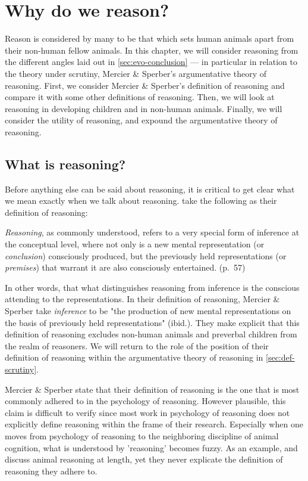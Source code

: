 \chapter{Why do we reason?}
\label{ch:reasoning}

Reason is considered by many to be that which sets human animals apart from their non-human fellow animals. In this chapter, we will consider reasoning from the different angles laid out in \cref{sec:evo-conclusion} --- in particular in relation to the theory under scrutiny, Mercier \& Sperber's argumentative theory of reasoning. First, we consider Mercier \& Sperber's definition of reasoning and compare it with some other definitions of reasoning. Then, we will look at reasoning in developing children and in non-human animals. Finally, we will consider the utility of reasoning, and expound the argumentative theory of reasoning.

\section{What is reasoning?}
\label{sec:reasoning-def}

Before anything else can be said about reasoning, it is critical to get clear what we mean exactly when we talk about reasoning. \citet{MS11} take the following as their definition of reasoning:

\begin{quoting}
    \emph{Reasoning}, as commonly understood, refers to a very special form of inference at the conceptual level, where not only is a new mental representation (or \emph{conclusion}) consciously produced, but the previously held representations (or \emph{premises}) that warrant it are also consciously entertained.
    \hfill (p.~57)
\end{quoting}
In other words, that what distinguishes reasoning from inference is the conscious attending to the representations.
In their definition of reasoning, Mercier \& Sperber take \emph{inference} to be "the production of new mental representations on the basis of previously held representations" (ibid.). They make explicit that this definition of reasoning excludes non-human animals and preverbal children from the realm of reasoners.
We will return to the role of the position of their definition of reasoning within the argumentative theory of reasoning in \cref{sec:def-scrutiny}.

Mercier \& Sperber state that their definition of reasoning is the one that is most commonly adhered to in the psychology of reasoning. However plausible, this claim is difficult to verify since most work in psychology of reasoning does not explicitly define reasoning within the frame of their research. Especially when one moves from psychology of reasoning to the neighboring discipline of animal cognition, what is understood by 'reasoning' becomes fuzzy. As an example, \citet{Andrews15} and \citet{Call06} discuss animal reasoning at length, yet they never explicate the definition of reasoning they adhere to.

